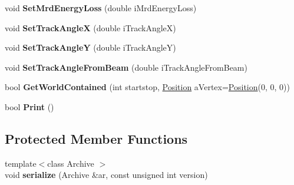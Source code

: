 \begin{DoxyCompactItemize}
\item 
\hypertarget{classMCParticle_a3db0d00c918e435c4cacc51e80fad7db}{
void {\bfseries SetMrdEnergyLoss} (double iMrdEnergyLoss)}
\label{classMCParticle_a3db0d00c918e435c4cacc51e80fad7db}

\item 
\hypertarget{classMCParticle_abc9a006d2fb4c95ca7f08fa218867c21}{
void {\bfseries SetTrackAngleX} (double iTrackAngleX)}
\label{classMCParticle_abc9a006d2fb4c95ca7f08fa218867c21}

\item 
\hypertarget{classMCParticle_af39b59b0cde215f2a6fe2183d8c580b9}{
void {\bfseries SetTrackAngleY} (double iTrackAngleY)}
\label{classMCParticle_af39b59b0cde215f2a6fe2183d8c580b9}

\item 
\hypertarget{classMCParticle_af278f6d766d7a4cc4818ae0b3e64f73f}{
void {\bfseries SetTrackAngleFromBeam} (double iTrackAngleFromBeam)}
\label{classMCParticle_af278f6d766d7a4cc4818ae0b3e64f73f}

\item 
\hypertarget{classMCParticle_a1691c5d5d847e0a2419cdad793ff2ddb}{
bool {\bfseries GetWorldContained} (int startstop, \hyperlink{classPosition}{Position} aVertex=\hyperlink{classPosition}{Position}(0, 0, 0))}
\label{classMCParticle_a1691c5d5d847e0a2419cdad793ff2ddb}

\item 
\hypertarget{classMCParticle_a602114887228de2afbfcd0a31ddba66c}{
bool {\bfseries Print} ()}
\label{classMCParticle_a602114887228de2afbfcd0a31ddba66c}

\end{DoxyCompactItemize}
\subsection*{Protected Member Functions}
\begin{DoxyCompactItemize}
\item 
\hypertarget{classMCParticle_aa446838baf0a069b6ce6275d90f7ff26}{
{\footnotesize template$<$class Archive $>$ }\\void {\bfseries serialize} (Archive \&ar, const unsigned int version)}
\label{classMCParticle_aa446838baf0a069b6ce6275d90f7ff26}

\end{DoxyCompactItemize}
